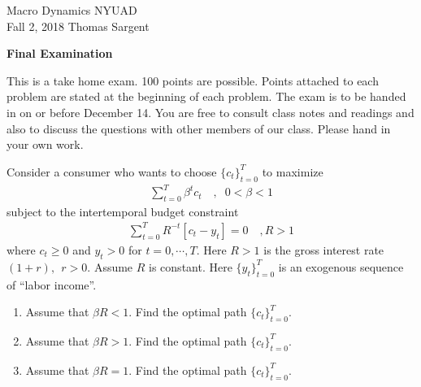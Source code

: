 \documentclass{article}
\begin{document}
\overfullrule=0pt
\def\frac#1#2{#1\over #2}
%
\def\bmatrix#1{\left[ \matrix{#1} \right]}
\def\be{{\beta}}
\def\toone{{t+1}}

\overfullrule=0pt

\noindent Macro Dynamics \hfill NYUAD \\
Fall 2, 2018 \hfill Thomas Sargent 
\vspace{.3cm}

\centerline{\bf Final Examination}


\medskip

  This is a take home exam.  100 points are possible. Points attached to each problem are stated
at the beginning of each problem. The exam is to be handed in on or before December 14.  
You are free to consult class notes and readings and also to discuss the questions with
other members of our class. Please hand in your own work.

\medskip

\noindent 
 

\medskip
{}

\medskip 

\noindent  Consider a consumer who wants to choose $\{c_t\}_{t=0}^T$ to maximize
\begin{align*}\sum_{t=0}^T \beta^tc_t  \quad  , \;\;  0< \beta<1\end{align*}
subject to the intertemporal budget constraint
\begin{align*} 
\sum_{t=0}^T R^{-t}[c_t-y_t]=0  \quad  ,   R>1 
\end{align*} where $c_t\geq0$ and $y_t>0$ for $t=0,\cdots,T$. Here $R>1$ is the gross interest rate $(1+r),\ \  r>0$. Assume $R$ is constant. Here $\{y_t\}_{t=0}^T $ is an exogenous sequence of ``labor income''.
\begin{enumerate}[\bf a.]
\item Assume that $\beta R < 1$. Find the optimal path $\{c_t\}_{t=0}^T$.
\item  Assume that $\beta R > 1$. Find the optimal path $\{c_t\}_{t=0}^T$.
\item Assume that $\beta R = 1$. Find the optimal path $\{c_t\}_{t=0}^T$.
\end{enumerate}
\medskip
{}

\medskip
\end{document}
